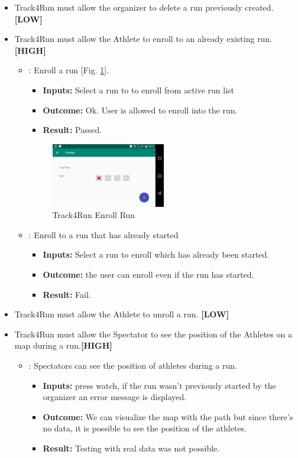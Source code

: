 \documentclass[a4paper, hidelinks, 12pt]{report}
\newcommand\requirement[1]{\item[{[REQ-#1]}] }
\newcommand\test[1]{\item[{[TEST-#1]}] }
\begin{document}
\begin{itemize}
	\requirement{27} Track4Run must allow the organizer to delete a run previously created. \textbf{[LOW]}
	\requirement{28} Track4Run must allow the Athlete to enroll to an already existing run. \textbf{[HIGH]}
		\begin{itemize}
	\test{20} : Enroll a run [Fig. \ref{fig:run_list}].
				\begin{itemize}
			\item \textbf{Inputs: } Select a run to to enroll from active run list
			\item \textbf{Outcome: } Ok. User is allowed to enroll into the run.
			\item \textbf{Result: } Passed.
			\end{itemize}
\begin{figure}[H]
					\centering
				\includegraphics[width=0.5\textwidth]{images/runs_list.jpeg}
					\caption[Track4Run Enroll Run]{Track4Run Enroll Run}
				\label{fig:run_list}
			\end{figure}
\test{21} : Enroll to a run that has already started
				\begin{itemize}
			\item \textbf{Inputs: } Select a run to enroll which has already been started.
			\item \textbf{Outcome: } the user can enroll even if the run has started.
			\item \textbf{Result: } Fail. 
			\end{itemize}

	\end{itemize}
	\requirement{29}  Track4Run must allow the Athlete to unroll a run. \textbf{[LOW]}
 	\requirement{30} Track4Run must allow the Spectator to see the position of the Athletes on a map during a run.\textbf{[HIGH]}
 			\begin{itemize}
	\test{22} : Spectators can see the position of athletes during a run.
				\begin{itemize}
			\item \textbf{Inputs: } press watch, if the run wasn't previously started by the organizer an error message is displayed.
			\item \textbf{Outcome: } We can visualize the map with the path but since there's no data, it is possible to see the position of the athletes.
			\item \textbf{Result: } Testing with real data was not possible.
			\end{itemize}


\end{itemize}
\end{itemize}
\end{document}
